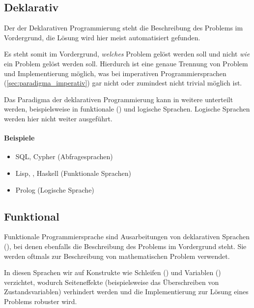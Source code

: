 \subsection{Deklarativ}

    Der der Deklarativen Programmierung steht die Beschreibung des Problems im Vordergrund, die Lösung wird hier meist automatisiert gefunden.
    
    Es steht somit im Vordergrund, \textit{welches} Problem gelöst werden soll und nicht \textit{wie} ein Problem gelöst werden soll. Hierdurch ist eine genaue Trennung von Problem und Implementierung möglich, was bei imperativen Programmiersprachen (\ref{sec:paradigma_imperativ}) gar nicht oder zumindest nicht trivial möglich ist.
    
    Das Paradigma der deklarativen Programmierung kann in weitere unterteilt werden, beispielsweise in funktionale () und logische Sprachen. Logische Sprachen werden hier nicht weiter ausgeführt.
    
    \paragraph{Beispiele}
        \begin{itemize}
            \item SQL, Cypher (Abfragesprachen)
            \item Lisp, \racket, Haskell (Funktionale Sprachen)
            \item Prolog (Logische Sprache)
        \end{itemize}

\subsection{Funktional}

    Funktionale Programmiersprache sind Ausarbeitungen von deklarativen Sprachen (), bei denen ebenfalls die Beschreibung des Problems im Vordergrund steht. Sie werden oftmals zur Beschreibung von mathematischen Problem verwendet.
    
    In diesen Sprachen wir auf Konstrukte wie Schleifen () und Variablen () verzichtet, wodurch Seiteneffekte (beispielsweise das Überschreiben von Zustandsvariablen) verhindert werden und die Implementierung zur Lösung eines Problems robuster wird.
    
